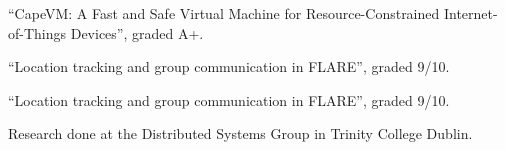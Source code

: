 “CapeVM: A Fast and Safe Virtual Machine for Resource-Constrained Internet-of-Things Devices”, graded A+.

\medskip


“Location tracking and group communication in FLARE”, graded 9/10.

\medskip


“Location tracking and group communication in FLARE”, graded 9/10.

\medskip

Research done at the Distributed Systems Group in Trinity College Dublin.








